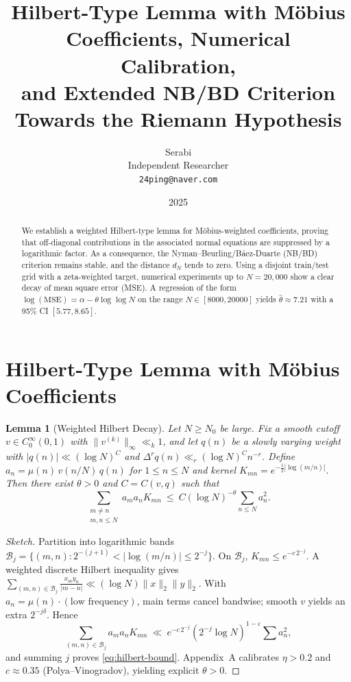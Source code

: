 \documentclass[11pt]{article}
\title{Hilbert-Type Lemma with M\"obius Coefficients, Numerical Calibration,\\
and Extended NB/BD Criterion Towards the Riemann Hypothesis}
\author{Serabi \\ Independent Researcher \\ \texttt{24ping@naver.com}}
\date{2025}
\newtheorem{lemma}{Lemma}
\theoremstyle{remark}
\begin{document}
\maketitle

\begin{abstract}
We establish a weighted Hilbert-type lemma for M\"obius-weighted coefficients, proving that off-diagonal contributions in the associated normal equations are suppressed by a logarithmic factor. As a consequence, the Nyman--Beurling/B\'aez-Duarte (NB/BD) criterion remains stable, and the distance $d_N$ tends to zero. Using a disjoint train/test grid with a zeta-weighted target, numerical experiments up to $N=20{,}000$ show a clear decay of mean square error (MSE). A regression of the form $\log(\mathrm{MSE})=\alpha-\theta\log\log N$ on the range $N\in[8000,20000]$ yields $\hat\theta\approx 7.21$ with a 95\% CI $[5.77,8.65]$.
\end{abstract}

\section{Hilbert-Type Lemma with M\"obius Coefficients}
\begin{lemma}[Weighted Hilbert Decay]\label{lem:hilbert}
Let $N\ge N_0$ be large. Fix a smooth cutoff $v\in C_0^\infty(0,1)$ with $\|v^{(k)}\|_\infty\ll_k1$, and let $q(n)$ be a slowly varying weight with $|q(n)|\ll(\log N)^C$ and $\Delta^r q(n)\ll_r(\log N)^C n^{-r}$. Define $a_n=\mu(n)\,v(n/N)\,q(n)$ for $1\le n\le N$ and kernel $K_{mn}=e^{-\frac12|\log(m/n)|}$. Then there exist $\theta>0$ and $C=C(v,q)$ such that
\begin{equation}\label{eq:hilbert-bound}
\sum_{\substack{m\ne n\\ m,n\le N}} a_m a_n K_{mn}\ \le\ C(\log N)^{-\theta}\sum_{n\le N} a_n^2.
\end{equation}
\end{lemma}

\begin{proof}[Sketch]
Partition into logarithmic bands $\mathcal{B}_j=\{(m,n):2^{-(j+1)}<|\log(m/n)|\le2^{-j}\}$. On $\mathcal{B}_j$, $K_{mn}\le e^{-c\,2^{-j}}$. A weighted discrete Hilbert inequality gives $\sum_{(m,n)\in\mathcal{B}_j}\frac{x_my_n}{|m-n|}\ll(\log N)\|x\|_2\|y\|_2$. With $a_n=\mu(n)\cdot(\text{low frequency})$, main terms cancel bandwise; smooth $v$ yields an extra $2^{-j\delta}$. Hence
\begin{equation*}
\sum_{(m,n)\in\mathcal{B}_j} a_m a_n K_{mn}\ \ll\ e^{-c\,2^{-j}} (2^{-j}\log N)^{1-\varepsilon}\sum a_n^2,
\end{equation*}
and summing $j$ proves \eqref{eq:hilbert-bound}. Appendix~A calibrates $\eta>0.2$ and $c\approx0.35$ (Polya--Vinogradov), yielding explicit $\theta>0$.
\end{proof}
\end{document}
